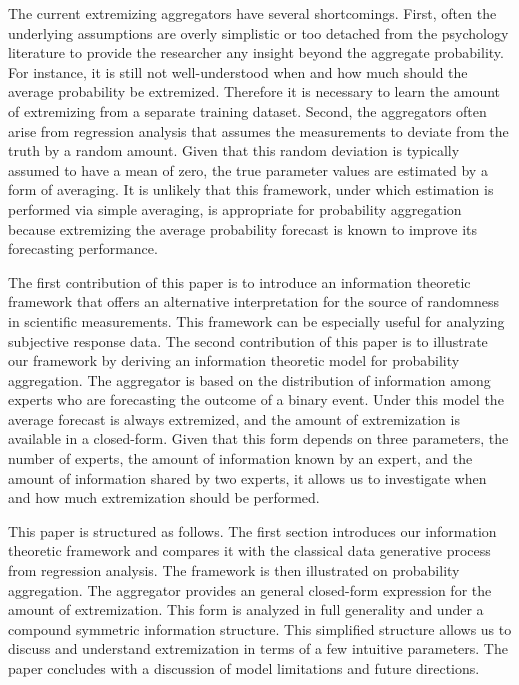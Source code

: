 \documentclass[11pt,twoside]{article}
\begin{document}
The current extremizing aggregators have several shortcomings. First, often the underlying assumptions are overly simplistic or too detached from the psychology literature to provide the researcher any insight beyond the aggregate probability. For instance, it is still not well-understood when and how much should the average probability be extremized. Therefore it is necessary to learn the amount of extremizing from a separate training dataset. Second, the aggregators often arise from regression analysis that assumes the measurements to deviate from the truth by a random amount. Given that this random deviation is typically assumed to have a mean of zero, the true parameter values are estimated by a form of averaging. It is unlikely that this framework, under which estimation is performed via simple averaging, is appropriate for probability aggregation because extremizing the average probability forecast is known to improve its forecasting performance.

The first contribution of this paper is to introduce an information theoretic framework that offers an alternative interpretation for the source of randomness in scientific measurements. This framework can be especially useful for analyzing subjective response data. The second contribution of this paper is to illustrate our framework by deriving an information theoretic model for probability aggregation. The aggregator is based on the distribution of information among experts who are forecasting the outcome of a binary event.  Under this model the average forecast is always extremized, and the amount of extremization is available in a closed-form. Given that this form depends on three parameters,  the number of experts, the amount of information known by an expert, and the amount of information shared by two experts, it allows us to investigate when and how much extremization should be performed. 

This paper is structured as follows. The first section introduces our information theoretic framework and  compares it with the classical data generative process from regression analysis. The framework is then illustrated on probability aggregation. The aggregator provides an general closed-form expression for the amount of extremization. This form is analyzed in full generality and under a compound symmetric information structure. This simplified structure allows us to discuss and understand extremization in terms of a few intuitive parameters. The paper concludes with a discussion of  model limitations and future directions. 
\end{document}
